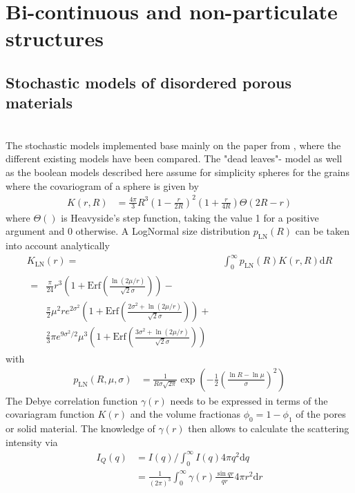 \section{Bi-continuous and non-particulate structures}

\subsection{Stochastic models of disordered porous materials}~\\

The stochastic models implemented base mainly on the paper from \cite{Gommes2018}, where the different existing models have been  compared. The "dead leaves"- model as well as the boolean models described here assume for simplicity spheres for the grains where the covariogram of a sphere is given by
\begin{align}\label{eq:covariogram_sphere}
K(r,R) &= \frac{4\pi}{3}R^3\left(1-\frac{r}{2R}\right)^2\left(1+\frac{r}{4R}\right)\Theta(2R-r)
\end{align}
where $\Theta()$ is Heavyside's step function, taking the value 1 for a positive argument and 0 otherwise. A LogNormal size distribution $p_\mathrm{LN}(R)$ can be taken into account analytically
\begin{align}
  K_\mathrm{LN}(r) =& \int_0^\infty  p_\mathrm{LN}(R) K(r,R) \mathrm{d}R \nonumber\\
       \begin{split}
            =& \frac{\pi}{24} r^3 \left(1+\mathrm{Erf}\left(\frac{\ln(2\mu/r)}{\sqrt{2}\sigma}\right)\right) -\\
            & \frac{\pi}{2}\mu^2r e^{2\sigma^2} \left(1+\mathrm{Erf}\left(\frac{2\sigma^2+\ln(2\mu/r)}{\sqrt{2}\sigma}\right)\right) +\\
            & \frac23 \pi e^{9\sigma^2/2}\mu^3\left(1+\mathrm{Erf}\left(\frac{3\sigma^2+\ln(2\mu/r)}{\sqrt{2}\sigma}\right)\right)
       \end{split} \label{eq:covariogram_sphere_LogNorm}
\end{align}
with
\begin{align}
  p_\mathrm{LN}(R,\mu,\sigma) &=  \frac{1}{R\sigma \sqrt{2 \pi}}\exp\left(-\frac{1}{2}\left(\frac{\ln R -
        \ln\mu}{\sigma}\right)^2\right)
\end{align}
The Debye correlation function $\gamma(r)$ needs to be expressed in terms of the covariagram function $K(r)$ and the volume fractionas $\phi_0=1-\phi_1$ of the pores or solid material. The knowledge of $\gamma(r)$ then allows to calculate the scattering intensity via
\begin{align}
  I_Q(q) &= I(q)/\int_0^\infty I(q) 4\pi q^2 \mathrm{d}q \\
         &= \frac{1}{(2\pi)^3} \int_0^\infty \gamma(r) \frac{\sin qr}{qr}4\pi r^2\mathrm{d}r
\end{align}

